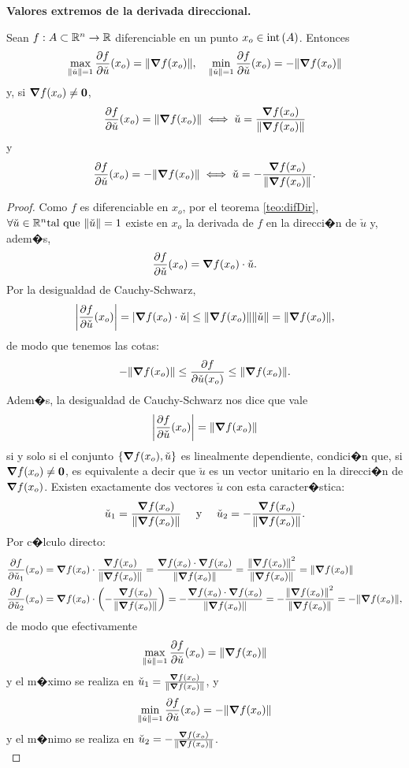 \documentclass[a4paper]{scrartcl} %
\begin{document}
\begin{theorem}\textbf{Valores extremos de la derivada direccional.} \label{teo:max_deriv}
\mbox{}

 Sean $f: A \subset \mathbb{R}^n \to \mathbb{R}$ diferenciable en un punto $x_o \in \operatorname{int}{(A)}$. Entonces 
 \[
  \max_{\norm{\check{u}} = 1} \frac{\partial f}{\partial \check{u}} (x_o) = \norm{\grad f (x_o)}, \quad 
  \min_{\norm{\check{u}} = 1} \frac{\partial f}{\partial \check{u}} (x_o) = -\norm{\grad f (x_o)}
 \]
y, si $\grad f(x_o) \ne \mathbf{0}$,
\[
 \frac{\partial f}{\partial \check{u}} (x_o) = \norm{\grad f (x_o)} \iff \check{u} = \frac{\grad f(x_o)}{\norm{\grad f(x_o)}}
\]
y
\[
 \frac{\partial f}{\partial \check{u}} (x_o) = -\norm{\grad f (x_o)} \iff \check{u} = -\frac{\grad f(x_o)}{\norm{\grad f(x_o)}}.
\]
\begin{proof}
\mbox{}

 Como $f$ es diferenciable en $x_o$, por el teorema \eqref{teo:difDir}, $\forall \check{u} \in \mathbb{R}^n \text{tal que } \norm{\check{u}} = 1$ existe en $x_o$ la derivada de $f$ en la direcci�n de $\check{u}$ y, adem�s,
\[
 \frac{\partial f}{\partial \check{u}} (x_o) = \grad f (x_o) \cdot \check{u}.
\]
Por la desigualdad de Cauchy-Schwarz, 
\[
 \abs{\frac{\partial f}{\partial \check{u}} (x_o)} = \abs{\grad f (x_o) \cdot \check{u}} \le \norm{\grad f (x_o)}\norm{\check{u}} = \norm{\grad f (x_o)},
\]
de modo que tenemos las cotas:
\[
 -\norm{\grad f (x_o)} \le \frac{\partial f}{\partial \check{u} (x_o)} \le \norm{\grad f (x_o)}.
\]
Adem�s, la desigualdad de Cauchy-Schwarz nos dice que vale
\[
 \abs{\frac{\partial f}{\partial \check{u}} (x_o)} = \norm{\grad f (x_o)}
\]
si y solo si el conjunto $\{\grad f(x_o), \check{u} \}$ es linealmente dependiente, condici�n que, si $\grad f(x_o) \ne \mathbf{0}$, es equivalente a decir que $\check{u}$ es un vector unitario en la direcci�n de $\grad f(x_o)$. Existen exactamente dos vectores $\check{u}$ con esta caracter�stica:
\[
 \check{u}_1 = \frac{\grad f(x_o)}{\norm{\grad f(x_o)}} \quad \text{ y } \quad \check{u}_2 = -\frac{\grad f(x_o)}{\norm{\grad f(x_o)}}.
\]
Por c�lculo directo:
\begin{align*}
 \frac{\partial f}{\partial \check{u}_1} (x_o) &= \grad f (x_o) \cdot \frac{\grad f(x_o)}{\norm{\grad f(x_o)}} = \frac{ \grad f (x_o) \cdot \grad f(x_o) }{\norm{\grad f(x_o)}} = \frac{\norm{\grad f (x_o)}^2 }{\norm{\grad f(x_o)}} = \norm{\grad f (x_o)} \\
%  
 \frac{\partial f}{\partial \check{u}_2} (x_o) &= \grad f (x_o) \cdot \left( - \frac{\grad f(x_o)}{\norm{\grad f(x_o)}} \right) = -\frac{ \grad f (x_o) \cdot \grad f(x_o) }{\norm{\grad f(x_o)}} = -\frac{\norm{\grad f (x_o)}^2 }{\norm{\grad f(x_o)}} = -\norm{\grad f (x_o)},
\end{align*}
de modo que efectivamente
\[
 \max_{\norm{\check{u}}=1} \frac{\partial f}{\partial \check{u}} (x_o) = \norm{\grad f (x_o)}
\]
y el m�ximo se realiza en $\check{u}_1 = \frac{\grad f(x_o)}{\norm{\grad f(x_o)}}$,
y
\[
 \min_{\norm{\check{u}}=1} \frac{\partial f}{\partial \check{u}} (x_o) = -\norm{\grad f (x_o)}
\]
y el m�nimo se realiza en $\check{u}_2 = -\frac{\grad f(x_o)}{\norm{\grad f(x_o)}}$. \\


\end{proof}
\end{theorem}
\end{document}
